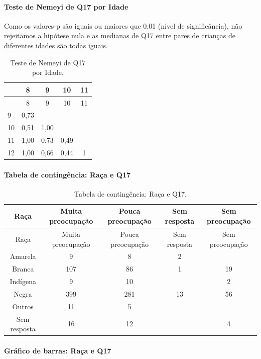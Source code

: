 \documentclass[]{article}
\let\oldparagraph\paragraph
\renewcommand{\paragraph}[1]{\oldparagraph{#1}\mbox{}}
\begin{document}
\hypertarget{teste-de-nemeyi-de-q17-por-idade}{%
\paragraph{Teste de Nemeyi de Q17 por Idade}\label{teste-de-nemeyi-de-q17-por-idade}}

Como os valores-p são iguais ou maiores que 0.01 (nível de significância), não rejeitamos a hipótese nula e as medianas de Q17 entre pares de crianças de diferentes idades são todas iguais.

\begin{longtable}[]{@{}lcccc@{}}
\caption{\label{tab:unnamed-chunk-219}Teste de Nemeyi de Q17 por Idade.}\tabularnewline
\toprule
& 8 & 9 & 10 & 11\tabularnewline
\midrule
\endfirsthead
\toprule
& 8 & 9 & 10 & 11\tabularnewline
\midrule
\endhead
9 & 0,73 & & &\tabularnewline
10 & 0,51 & 1,00 & &\tabularnewline
11 & 1,00 & 0,73 & 0,49 &\tabularnewline
12 & 1,00 & 0,66 & 0,44 & 1\tabularnewline
\bottomrule
\end{longtable}

\cleardoublepage

\hypertarget{tabela-de-continguxeancia-rauxe7a-e-q17}{%
\paragraph{Tabela de contingência: Raça e Q17}\label{tabela-de-continguxeancia-rauxe7a-e-q17}}

\begin{longtable}[]{@{}ccccc@{}}
\caption{\label{tab:unnamed-chunk-220}Tabela de contingência: Raça e Q17.}\tabularnewline
\toprule
Raça & Muita preocupação & Pouca preocupação & Sem resposta & Sem preocupação\tabularnewline
\midrule
\endfirsthead
\toprule
Raça & Muita preocupação & Pouca preocupação & Sem resposta & Sem preocupação\tabularnewline
\midrule
\endhead
Amarela & 9 & 8 & 2 &\tabularnewline
Branca & 107 & 86 & 1 & 19\tabularnewline
Indígena & 9 & 10 & & 2\tabularnewline
Negra & 399 & 281 & 13 & 56\tabularnewline
Outros & 11 & 5 & &\tabularnewline
Sem resposta & 16 & 12 & & 4\tabularnewline
\bottomrule
\end{longtable}

\hypertarget{gruxe1fico-de-barras-rauxe7a-e-q17}{%
\paragraph{Gráfico de barras: Raça e Q17}\label{gruxe1fico-de-barras-rauxe7a-e-q17}}
\end{document}
